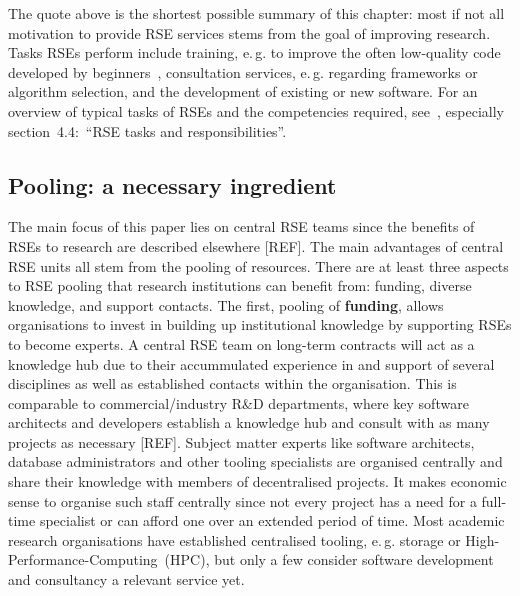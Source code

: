 \documentclass[a4paper]{article}
\makeatletter
\newcommand*{\eg}{e.\,g.\@\xspace}
\makeatother
\begin{document}
The quote above is the shortest possible summary of this chapter: most if not all motivation to provide RSE services stems from the goal of improving research.
Tasks RSEs perform include training, \eg{} to improve the often low-quality code developed by beginners~\autocite{Ostlund2023}, consultation services, \eg{} regarding frameworks or algorithm selection, and the development of existing or new software.
For an overview of typical tasks of RSEs and the competencies required, see~\autocite{goth_foundational_competencies_2024}, especially section\ 4.4:\ “RSE tasks and responsibilities”.

\subsection{Pooling: a necessary ingredient}
The main focus of this paper lies on central RSE teams since the benefits of RSEs to research are described elsewhere [REF].
The main advantages of central RSE units all stem from the pooling of resources.
There are at least three aspects to RSE pooling that research institutions can benefit from: funding, diverse knowledge, and support contacts.
The first, pooling of \textbf{funding}, allows organisations to invest in building up institutional knowledge by supporting RSEs to become experts.
A central RSE team on long-term contracts will act as a knowledge hub due to their accummulated experience in and support of several disciplines as well as established contacts within the organisation.
This is comparable to commercial/industry R\&D departments, where key software architects and developers establish a knowledge hub and consult with as many projects as necessary  [REF].
Subject matter experts like software architects, database administrators and other tooling specialists are organised centrally and share their knowledge with members of decentralised projects.
It makes economic sense to organise such staff centrally since not every project has a need for a full-time specialist or can afford one over an extended period of time.
Most academic research organisations have established centralised tooling, \eg{} storage or High-Performance-Computing\ (HPC), but only a few consider software development and consultancy a relevant service yet.
\end{document}
